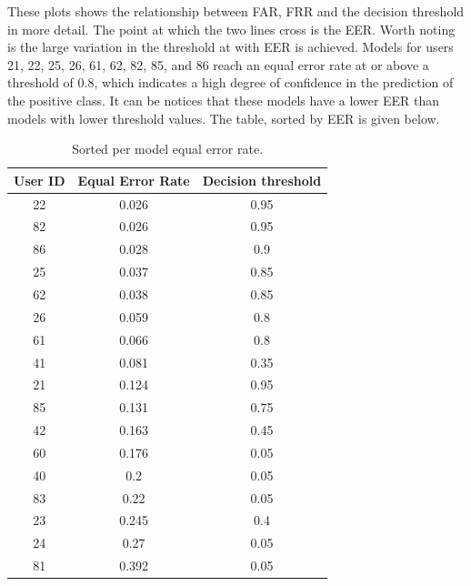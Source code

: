 These plots shows the relationship between FAR, FRR and the decision threshold in more detail. The point at which the two lines cross is the EER. Worth noting is the large variation in the threshold at with EER is achieved. Models for users 21, 22, 25, 26, 61, 62, 82, 85, and 86 reach an equal error rate at or above a threshold of 0.8, which indicates a high degree of confidence in the prediction of the positive class. It can be notices that these models have a lower EER than models with lower threshold values. The table, sorted by EER is given below.

\begin{center}
	\begin{table}[H]
		\begin{center}
			\begin{tabular}{ |c|c|c| } 
				\hline
				User ID & Equal Error Rate & Decision threshold \\
				\hline
				\hline
				22 & 0.026 & 0.95 \\
				\hline
				82 & 0.026 & 0.95 \\
				\hline
				86 & 0.028 & 0.9 \\
				\hline
				25 & 0.037 & 0.85 \\
				\hline
				62 & 0.038 & 0.85 \\
				\hline
				26 & 0.059 & 0.8 \\
				\hline
				61 & 0.066 & 0.8 \\
				\hline
				41 & 0.081 & 0.35 \\
				\hline
				21 & 0.124 & 0.95 \\
				\hline
				85 & 0.131 & 0.75 \\
				\hline
				42 & 0.163 & 0.45 \\
				\hline
				60 & 0.176 & 0.05 \\
				\hline
				40 & 0.2 & 0.05 \\
				\hline
				83 & 0.22 & 0.05 \\
				\hline
				23 & 0.245 & 0.4 \\
				\hline
				24 & 0.27 & 0.05 \\
				\hline
				81 & 0.392 & 0.05 \\
				\hline
			\end{tabular}
		\end{center}
		\caption{Sorted per model equal error rate.}
		\label{table:EER_separate_sorted}
	\end{table}
\end{center}

